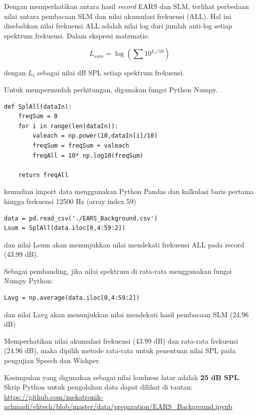 \documentclass[12pt,]{article}
\begin{document}
	Dengan memperhatikan antara hasil \textit{record} EARS dan SLM,
	terlihat perbedaan nilai antara pembacaan SLM dan nilai akumulasi frekuensi (ALL).
	Hal ini disebabkan nilai frekuensi ALL adalah nilai log dari jumlah anti-log setiap spektrum frekuensi.
	Dalam ekspresi matematis:

	\[L_{sum} = \log (\sum 10^{L_i/10}) \]

	dengan \(L_i\) sebagai nilai dB SPL setiap spektrum frekuensi.

	Untuk mempermudah perhitungan, digunakan fungsi Python Numpy.

	\begin{verbatim}
def SplAll(dataIn):
	freqSum = 0
	for i in range(len(dataIn)):
		valeach = np.power(10,dataIn[i]/10)
		freqSum = freqSum + valeach
		freqAll = 10* np.log10(freqSum)

	return freqAll
	\end{verbatim}

	kemudian import data menggunakan Python Pandas dan kalkulasi baris pertama hingga frekuensi 12500 Hz (array index 59)

	\begin{verbatim}
data = pd.read_csv('./EARS_Background.csv')
Lsum = SplAll(data.iloc[0,4:59:2])
	\end{verbatim}

	dan nilai Lsum akan menunjukkan nilai mendekati frekuensi ALL pada record (43.99 dB).

	\newpage
	Sebagai pembanding, jika nilai spektrum di rata-rata menggunakan fungsi Numpy Python:

	\begin{verbatim}
Lavg = np.average(data.iloc[0,4:59:2])
	\end{verbatim}

	dan nilai Lavg akan menunjukkan nilai mendekati hasil pembacaan SLM (24.96 dB)

	Memperhatikan nilai akumulasi frekuensi (43.99 dB) dan rata-rata frekuensi (24.96 dB),
	maka dipilih metode rata-rata untuk penentuan nilai SPL pada pengujian Speech dan Wishper.

	Kesimpulan yang digunakan sebagai nilai loudness latar adalah \textbf{25 dB SPL}.
	Skrip Python untuk pengolahan data dapat dilihat di tautan:\\
	\url{https://github.com/mekatronik-achmadi/elitech/blob/master/data/preparation/EARS_Background.ipynb}
\end{document}
